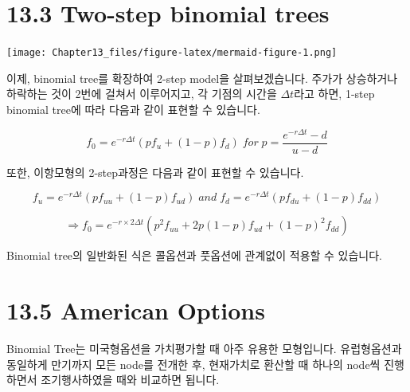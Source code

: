 \documentclass[
  letterpaper,
  DIV=11,
  numbers=noendperiod]{scrreprt}
\begin{document}
\section*{13.3 Two-step binomial trees}\label{two-step-binomial-trees}


\texttt{[image: Chapter13\_files/figure-latex/mermaid-figure-1.png]}

이제, binomial tree를 확장하여 2-step model을 살펴보겠습니다. 주가가
상승하거나 하락하는 것이 2번에 걸쳐서 이루어지고, 각 기점의 시간을
\(\Delta t\)라고 하면, 1-step binomial tree에 따라 다음과 같이 표현할 수
있습니다.

\[f_0=e^{-r\Delta t}(pf_u+(1-p)f_d)\;for\;p=\frac{e^{-r\Delta t}-d}{u-d}\]

또한, 이항모형의 2-step과정은 다음과 같이 표현할 수 있습니다.

\[f_u=e^{-r\Delta t}(pf_{uu}+(1-p)f_{ud})\;and\;f_d=e^{-r\Delta t}(pf_{du}+(1-p)f_{dd})\]

\[\Rightarrow f_0=e^{-r\times 2\Delta t}(p^2f_{uu}+2p(1-p)f_{ud}+(1-p)^2f_{dd})\]

\begin{tcolorbox}[enhanced jigsaw, titlerule=0mm, bottomtitle=1mm, left=2mm, title=\textcolor{quarto-callout-note-color}{\faInfo}\hspace{0.5em}{13.4 Put options example}, toptitle=1mm, bottomrule=.15mm, colframe=quarto-callout-note-color-frame, breakable, opacityback=0, rightrule=.15mm, opacitybacktitle=0.6, coltitle=black, colback=white, arc=.35mm, colbacktitle=quarto-callout-note-color!10!white, toprule=.15mm, leftrule=.75mm]

Binomial tree의 일반화된 식은 콜옵션과 풋옵션에 관계없이 적용할 수
있습니다.

\end{tcolorbox}

\section*{13.5 American Options}\label{american-options}


Binomial Tree는 미국형옵션을 가치평가할 때 아주 유용한 모형입니다.
유럽형옵션과 동일하게 만기까지 모든 node를 전개한 후, 현재가치로 환산할
때 하나의 node씩 진행하면서 조기행사하였을 때와 비교하면 됩니다.
\end{document}
